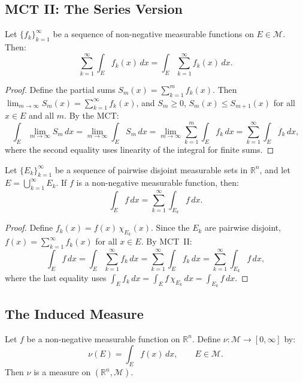 \documentclass[11pt]{report}
\begin{document}
\subsection{MCT II: The Series Version}

\begin{thmbox}[MCT II]
Let $\{f_k\}_{k=1}^{\infty}$ be a sequence of non-negative measurable functions on $E \in \mathcal{M}$. Then:
\[
\sum_{k=1}^{\infty} \int_E f_k(x)\,dx = \int_E \sum_{k=1}^{\infty} f_k(x)\,dx.
\]
\end{thmbox}

\begin{proof}
Define the partial sums $S_m(x) = \sum_{k=1}^{m} f_k(x)$. Then $\lim_{m \to \infty} S_m(x) = \sum_{k=1}^{\infty} f_k(x)$, and $S_m \geq 0$, $S_m(x) \leq S_{m+1}(x)$ for all $x \in E$ and all $m$. By the MCT:
\[
\int_E \lim_{m \to \infty} S_m\,dx = \lim_{m \to \infty} \int_E S_m\,dx = \lim_{m \to \infty} \sum_{k=1}^{m} \int_E f_k\,dx = \sum_{k=1}^{\infty} \int_E f_k\,dx,
\]
where the second equality uses linearity of the integral for finite sums.
\end{proof}

\begin{corbox}
Let $\{E_k\}_{k=1}^{\infty}$ be a sequence of pairwise disjoint measurable sets in $\mathbb{R}^n$, and let $E = \bigcup_{k=1}^{\infty} E_k$. If $f$ is a non-negative measurable function, then:
\[
\int_E f\,dx = \sum_{k=1}^{\infty} \int_{E_k} f\,dx.
\]
\end{corbox}

\begin{proof}
Define $f_k(x) = f(x)\,\chi_{E_k}(x)$. Since the $E_k$ are pairwise disjoint, $f(x) = \sum_{k=1}^{\infty} f_k(x)$ for all $x \in E$. By MCT~II:
\[
\int_E f\,dx = \int_E \sum_{k=1}^{\infty} f_k\,dx = \sum_{k=1}^{\infty} \int_E f_k\,dx = \sum_{k=1}^{\infty} \int_{E_k} f\,dx,
\]
where the last equality uses $\int_E f_k\,dx = \int_E f\,\chi_{E_k}\,dx = \int_{E_k} f\,dx$.
\end{proof}

\subsection{The Induced Measure}

\begin{defbox}
Let $f$ be a non-negative measurable function on $\mathbb{R}^n$. Define $\nu: \mathcal{M} \to [0, \infty]$ by:
\[
\nu(E) = \int_E f(x)\,dx, \qquad E \in \mathcal{M}.
\]
Then $\nu$ is a measure on $(\mathbb{R}^n, \mathcal{M})$.
\end{defbox}
\end{document}
